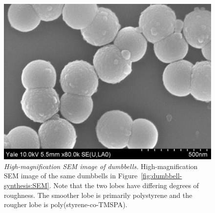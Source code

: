 \begin{figure}[htbp]
\includegraphics[width=1.0\textwidth]{figures/jDB09SEMDetail.pdf}
\caption{\label{fig:jDB09-detail} \emph{High-magnification SEM image of dumbbells.}
	High-magnification SEM image of the same dumbbells in Figure~\ref{fig:dumbbell-synthesis:SEM}. Note that the two lobes have differing degrees of roughness. The smoother lobe is primarily polystyrene and the rougher lobe is poly(styrene-co-TMSPA).}
\end{figure}

